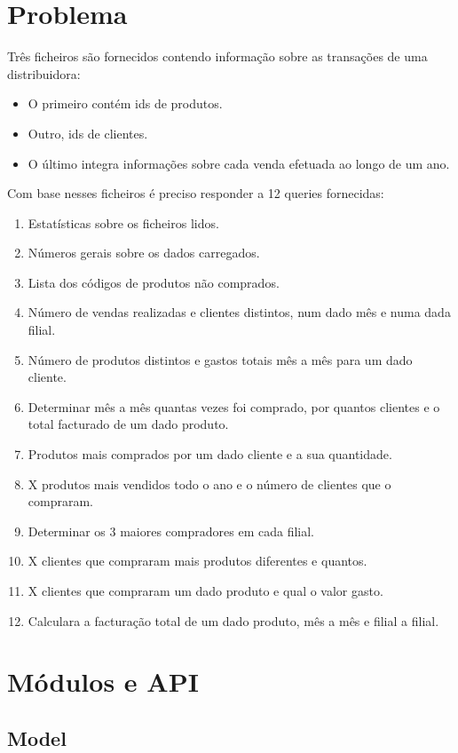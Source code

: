 \documentclass[a4paper]{report}
\begin{document}
\chapter{Problema}
Três ficheiros são fornecidos contendo informação sobre as transações de uma distribuidora:
\begin{itemize}
    \item O primeiro contém ids de produtos.
    \item Outro, ids de clientes.
    \item O último integra informações sobre cada venda efetuada ao longo de um ano. 
\end{itemize}
Com base nesses ficheiros é preciso responder a 12 queries fornecidas:
\begin{enumerate}
    \item Estatísticas sobre os ficheiros lidos.
    \item Números gerais sobre os dados carregados.
    \item Lista dos códigos de produtos não comprados.
    \item Número de vendas realizadas e clientes distintos, num dado mês e numa dada filial.
    \item Número de produtos distintos e gastos totais mês a mês para um dado cliente.
    \item Determinar mês a mês quantas vezes foi comprado, por quantos clientes e o total facturado de um dado produto.
    \item Produtos mais comprados por um dado cliente e a sua quantidade.
    \item X produtos mais vendidos todo o ano e o número de clientes que o compraram.
    \item Determinar os 3 maiores compradores em cada filial.
    \item X clientes que compraram mais produtos diferentes e quantos.
    \item X clientes que compraram um dado produto e qual o valor gasto.
    \item Calculara a facturação total de um dado produto, mês a mês e filial a filial.
\end{enumerate}

\chapter{Módulos e API}\label{chap:api}

\section{Model}
\end{document}
